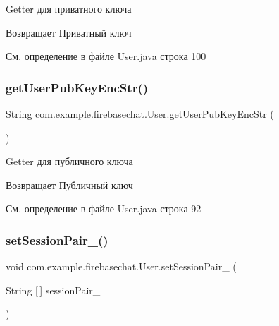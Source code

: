 Getter для приватного ключа 

\begin{DoxyReturn}{Возвращает}
Приватный ключ 
\end{DoxyReturn}


См. определение в файле User.\+java строка 100

\mbox{\label{classcom_1_1example_1_1firebasechat_1_1_user_af9252d4d96f56d8a74611553307df0a8}} 
\subsubsection{\texorpdfstring{get\+User\+Pub\+Key\+Enc\+Str()}{getUserPubKeyEncStr()}}
{\footnotesize\ttfamily String com.\+example.\+firebasechat.\+User.\+get\+User\+Pub\+Key\+Enc\+Str (\begin{DoxyParamCaption}{ }\end{DoxyParamCaption})}



Getter для публичного ключа 

\begin{DoxyReturn}{Возвращает}
Публичный ключ 
\end{DoxyReturn}


См. определение в файле User.\+java строка 92

\mbox{\label{classcom_1_1example_1_1firebasechat_1_1_user_aa46d2b146ffd91c6b9cf36ec5e194b1f}} 
\subsubsection{\texorpdfstring{set\+Session\+Pair\+\_\+()}{setSessionPair\_()}}
{\footnotesize\ttfamily void com.\+example.\+firebasechat.\+User.\+set\+Session\+Pair\+\_\+ (\begin{DoxyParamCaption}\item[{String \mbox{[}$\,$\mbox{]}}]{session\+Pair\+\_\+ }\end{DoxyParamCaption})}



